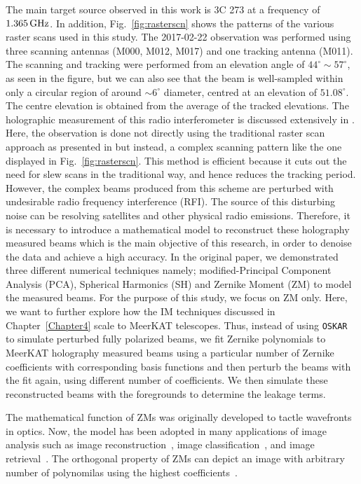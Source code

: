 The main target source observed in this work is 3C 273 at a frequency of $1.365 \, \rm GHz$. In addition, Fig.~\ref{fig:rasterscn}  shows the patterns of the various raster scans used in this study. The 2017-02-22 observation was performed using three scanning antennas (M000, M012, M017) and one tracking antenna (M011). The scanning and tracking were performed from an elevation angle of $44^{\circ} \sim 57^{\circ}$, as seen in the figure, but we can also see that the beam is well-sampled within only a circular region of around $\sim 6^{\circ}$ diameter, centred at an elevation of $51.08^{\circ}$. The centre elevation is obtained from the average of the tracked elevations.
%
\noindent The holographic measurement of this radio interferometer is discussed extensively in  \citep{7305152}. Here, the observation is done not directly using the traditional raster scan approach as presented in \citep{1988A&A...190..353E} but instead, a complex scanning pattern like the one displayed in Fig.~\ref{fig:rasterscn}. This method is efficient because it cuts out the need for slew scans in the traditional way, and hence reduces the tracking period. However, the complex beams produced from this scheme are perturbed with undesirable radio frequency interference (RFI). The source of this disturbing noise can be resolving satellites and other physical radio emissions. Therefore, it is necessary to introduce a mathematical model to reconstruct these holography measured beams which is the main objective of this research, in order to denoise the data and achieve a high accuracy. In the original paper, we demonstrated three different numerical techniques namely; modified-Principal Component Analysis (PCA), Spherical Harmonics (SH) and Zernike Moment (ZM) to model the measured beams. For the purpose of this study, we focus on ZM only. Here, we want to further explore how the IM techniques discussed in Chapter~\ref{Chapter4} scale  to MeerKAT telescopes. Thus, instead of using {\tt OSKAR} to simulate perturbed fully polarized beams, we fit Zernike polynomials to MeerKAT holography measured beams using a particular number of Zernike coefficients with corresponding basis functions and then perturb the beams with the fit again, using different number of coefficients. We then simulate these reconstructed beams with the foregrounds to determine the leakage terms. 

The mathematical function of ZMs was originally developed to tactle wavefronts in optics. Now, the model has been adopted in many applications of image analysis such as image reconstruction~\citep{6243926}, image classification~\citep{1414392,khotanzad1990classification}, and image retrieval~\citep{7569541}. The orthogonal property of ZMs can depict an image with arbitrary number of polynomilas using the highest coefficients~\citep{teh1988image}. 


